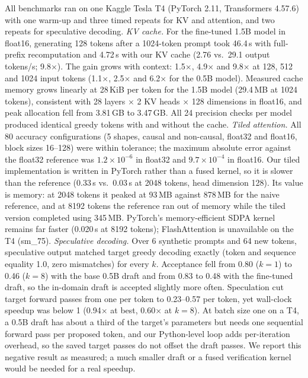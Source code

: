 All benchmarks ran on one Kaggle Tesla T4 (PyTorch 2.11, Transformers 4.57.6) with one warm-up and three timed repeats for KV and attention, and two repeats for speculative decoding. \emph{KV cache.} For the fine-tuned 1.5B model in float16, generating 128 tokens after a 1024-token prompt took 46.4\,s with full-prefix recomputation and 4.72\,s with our KV cache (2.76 vs.\ 29.1 output tokens/s; 9.8$\times$). The gain grows with context: 1.5$\times$, 4.9$\times$ and 9.8$\times$ at 128, 512 and 1024 input tokens (1.1$\times$, 2.5$\times$ and 6.2$\times$ for the 0.5B model). Measured cache memory grows linearly at 28\,KiB per token for the 1.5B model (29.4\,MB at 1024 tokens), consistent with 28 layers $\times$ 2 KV heads $\times$ 128 dimensions in float16, and peak allocation fell from 3.81\,GB to 3.47\,GB. All 24 precision checks per model produced identical greedy tokens with and without the cache.
\emph{Tiled attention.} All 80 accuracy configurations (5 shapes, causal and non-causal, float32 and float16, block sizes 16--128) were within tolerance; the maximum absolute error against the float32 reference was $1.2\times10^{-6}$ in float32 and $9.7\times10^{-4}$ in float16. Our tiled implementation is written in PyTorch rather than a fused kernel, so it is slower than the reference (0.33\,s vs.\ 0.03\,s at 2048 tokens, head dimension 128). Its value is memory: at 2048 tokens it peaked at 93\,MB against 878\,MB for the naive reference, and at 8192 tokens the reference ran out of memory while the tiled version completed using 345\,MB. PyTorch's memory-efficient SDPA kernel remains far faster (0.020\,s at 8192 tokens); FlashAttention is unavailable on the T4 (sm\_75).
\emph{Speculative decoding.} Over 6 synthetic prompts and 64 new tokens, speculative output matched target greedy decoding exactly (token and sequence equality 1.0, zero mismatches) for every $k$. Acceptance fell from 0.80 ($k{=}1$) to 0.46 ($k{=}8$) with the base 0.5B draft and from 0.83 to 0.48 with the fine-tuned draft, so the in-domain draft is accepted slightly more often. Speculation cut target forward passes from one per token to 0.23--0.57 per token, yet wall-clock speedup was below 1 (0.94$\times$ at best, 0.60$\times$ at $k{=}8$). At batch size one on a T4, a 0.5B draft has about a third of the target's parameters but needs one sequential forward pass per proposed token, and our Python-level loop adds per-iteration overhead, so the saved target passes do not offset the draft passes. We report this negative result as measured; a much smaller draft or a fused verification kernel would be needed for a real speedup.

